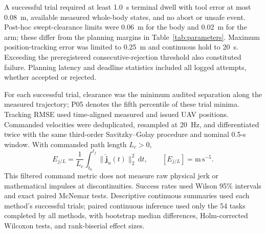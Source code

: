 \documentclass[journal,twoside]{IEEEtran}
\begin{document}
A successful trial required at least 1.0~s terminal dwell with tool error at most 0.08~m, available measured whole-body states, and no abort or unsafe event. Post-hoc swept-clearance limits were 0.06~m for the body and 0.02~m for the arm; these differ from the planning margins in Table~\ref{tab:parameters}. Maximum position-tracking error was limited to 0.25~m and continuous hold to 20~s. Exceeding the preregistered consecutive-rejection threshold also constituted failure. Planning latency and deadline statistics included all logged attempts, whether accepted or rejected.

For each successful trial, clearance was the minimum audited separation along the measured trajectory; P05 denotes the fifth percentile of these trial minima. Tracking RMSE used time-aligned measured and issued UAV positions. Commanded velocities were deduplicated, resampled at 20~Hz, and differentiated twice with the same third-order Savitzky--Golay procedure and nominal 0.5-s window. With commanded path length $L_c>0$,
\begin{equation}
E_{j/L}=\frac{1}{L_c}\int_{t_0}^{t_f}\|\hat{\mathbf j}_u(t)\|_2^2\,\mathrm dt,
\qquad [E_{j/L}]=\mathrm{m\,s^{-5}}.
\label{eq:jerk_metric}
\end{equation}
This filtered command metric does not measure raw physical jerk or mathematical impulses at discontinuities. Success rates used Wilson 95\% intervals and exact paired McNemar tests. Descriptive continuous summaries used each method's successful trials; paired continuous inference used only the 54 tasks completed by all methods, with bootstrap median differences, Holm-corrected Wilcoxon tests, and rank-biserial effect sizes.
\end{document}

